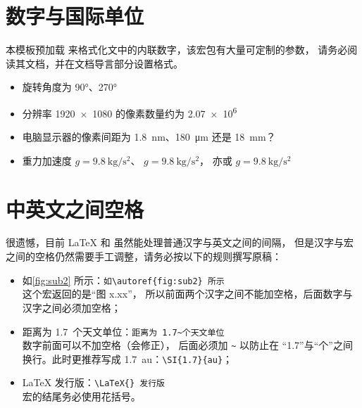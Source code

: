 \section{数字与国际单位}

本模板预加载  来格式化文中的内联数字，该宏包有大量可定制的参数，
请务必阅读其文档，并在文档导言部分设置格式。

\begin{itemize}
  \item 旋转角度为 \ang{90}、\ang{270}
  \item 分辨率 \num{1920x1080} 的像素数量约为 \num{2.07e6}
  \item 电脑显示器的像素间距为 \SI{1.8}{\nm}、\SI{180}{\um} 还是 \SI{18}{\mm}？
  \item 重力加速度 $g=\SI{9.8}{\kg\per\square\second}$、
  $g=\SI[inter-unit-product=\ensuremath{{}\cdot{}}]{9.8}{\kg\per\square\second}$，
  亦或 $g=\SI[per-mode=symbol]{9.8}{\kg\per\square\second}$
\end{itemize}

\section{中英文之间空格}

很遗憾，目前 \LaTeX{} 和 \CTeX{} 虽然能处理普通汉字与英文之间的间隔，
但是汉字与宏之间的空格仍然需要手工调整，请务必按以下的规则撰写原稿：
\begin{itemize}
  \item[\ding{51}] 如\autoref{fig:sub2} 所示：\verb|如\autoref{fig:sub2} 所示| \\
    这个宏返回的是“图 x.xx”，
    所以前面两个汉字之间不能加空格，后面数字与汉字之间必须加空格；
  \item[\ding{51}] 距离为 1.7~个天文单位：\verb|距离为 1.7~个天文单位| \\
    数字前面可以不加空格（\CTeX 会修正），
    后面必须加 \verb|~| 以防止在 “1.7”与“个”之间换行。此时更推荐写成 \SI{1.7}{au}：\verb|\SI{1.7}{au}|；
  \item[\ding{51}] \LaTeX{} 发行版：\verb|\LaTeX{} 发行版| \\
    宏的结尾务必使用花括号。
\end{itemize}
